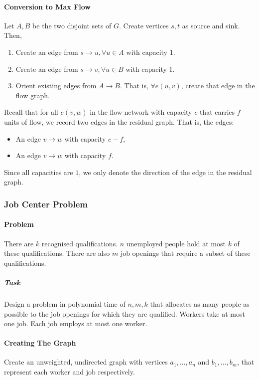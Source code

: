 \paragraph{Conversion to Max Flow}
Let \(A, B\) be the two disjoint sets of  \(G\).
Create vertices \(s, t\) as source and sink. Then,
 \begin{enumerate}
  \item Create an edge from \(s \to  u, \forall u \in A\) with capacity 1.
  \item Create an edge from \(s \to  v, \forall u \in B\) with capacity 1.
  \item Orient existing edges from \(A \to B\).
    That is, \(\forall e(u, v)\), create that edge in the flow graph.
\end{enumerate}

Recall that for all \(e(v, w)\) in the flow network with capacity
\(c\) that carries  \(f\) units of flow, we record two edges
in the residual graph.
That is, the edges:
\begin{itemize}
  \item An edge \(v \to  w\) with capacity \(c - f\),
  \item An edge \(v \to w\) with capacity \(f\).
\end{itemize}
Since all capacities are \(1\), we only denote the direction
of the edge in the residual graph.

\subsubsection{Job Center Problem}

\paragraph{Problem}
There are \(k\) recognised qualifications.
\(n\) unemployed people hold at most \(k\) of these qualifications.
There are also  \(m\) job openings that require a subset of these qualifications.

\subparagraph{Task}
Design a problem in polynomial time of \(n, m, k\) that allocates as many
people as possible to the job openings for which they are qualified.
Workers take at most  one job. Each job employs at most one worker.

\paragraph{Creating The Graph}
Create an unweighted, undirected graph with vertices
\(a_1, \ldots, a_n\) and \(b_1, \ldots, b_m\), that represent each worker
and job respectively.

